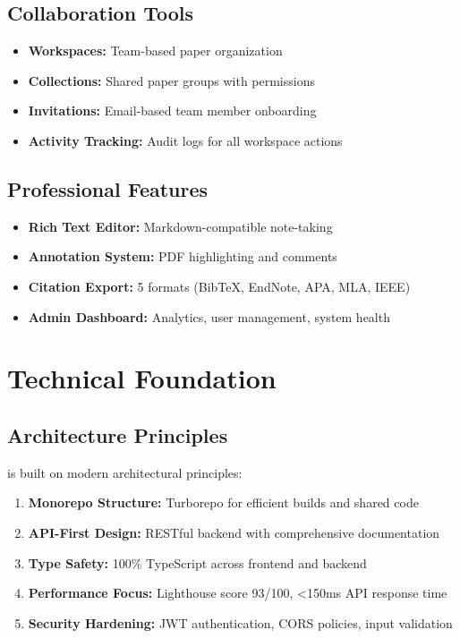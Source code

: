 \subsection{Collaboration Tools}
\begin{itemize}[leftmargin=*]
    \item \textbf{Workspaces:} Team-based paper organization
    \item \textbf{Collections:} Shared paper groups with permissions
    \item \textbf{Invitations:} Email-based team member onboarding
    \item \textbf{Activity Tracking:} Audit logs for all workspace actions
\end{itemize}

\subsection{Professional Features}
\begin{itemize}[leftmargin=*]
    \item \textbf{Rich Text Editor:} Markdown-compatible note-taking
    \item \textbf{Annotation System:} PDF highlighting and comments
    \item \textbf{Citation Export:} 5 formats (BibTeX, EndNote, APA, MLA, IEEE)
    \item \textbf{Admin Dashboard:} Analytics, user management, system health
\end{itemize}

\section{Technical Foundation}
\label{sec:technical-foundation}

\subsection{Architecture Principles}

\projectname{} is built on modern architectural principles:

\begin{enumerate}[leftmargin=*]
    \item \textbf{Monorepo Structure:} Turborepo for efficient builds and shared code
    \item \textbf{API-First Design:} RESTful backend with comprehensive documentation
    \item \textbf{Type Safety:} 100\% TypeScript across frontend and backend
    \item \textbf{Performance Focus:} Lighthouse score 93/100, <150ms API response time
    \item \textbf{Security Hardening:} JWT authentication, CORS policies, input validation
\end{enumerate}


